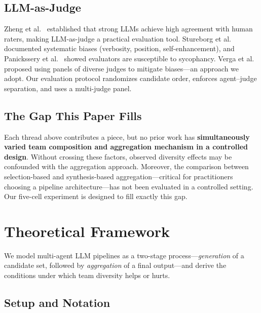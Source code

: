 \documentclass[10pt,twocolumn]{article}
\theoremstyle{remark}
\begin{document}
\subsection{LLM-as-Judge}

Zheng et al.~\cite{zheng2023judging} established that strong LLMs achieve high agreement with human raters, making LLM-as-judge a practical evaluation tool. Stureborg et al.~\cite{stureborg2024evaluation} documented systematic biases (verbosity, position, self-enhancement), and Panickssery et al.~\cite{panickssery2024self} showed evaluators are susceptible to sycophancy. Verga et al.~\cite{verga2024replacing} proposed using panels of diverse judges to mitigate biases---an approach we adopt. Our evaluation protocol randomizes candidate order, enforces agent--judge separation, and uses a multi-judge panel.

\subsection{The Gap This Paper Fills}

Each thread above contributes a piece, but no prior work has \textbf{simultaneously varied team composition and aggregation mechanism in a controlled design}. Without crossing these factors, observed diversity effects may be confounded with the aggregation approach. Moreover, the comparison between selection-based and synthesis-based aggregation---critical for practitioners choosing a pipeline architecture---has not been evaluated in a controlled setting. Our five-cell experiment is designed to fill exactly this gap.

\section{Theoretical Framework}
\label{sec:theory}

We model multi-agent LLM pipelines as a two-stage process---\emph{generation} of a candidate set, followed by \emph{aggregation} of a final output---and derive the conditions under which team diversity helps or hurts.

\subsection{Setup and Notation}
\label{sec:notation}
\end{document}

